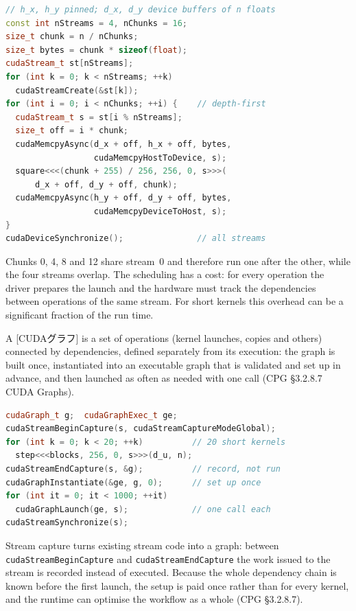 \documentclass[../main.tex]{subfiles}
\begin{document}
\begin{lstlisting}[language=C++, numbers=none]
// h_x, h_y pinned; d_x, d_y device buffers of n floats
const int nStreams = 4, nChunks = 16;
size_t chunk = n / nChunks;
size_t bytes = chunk * sizeof(float);
cudaStream_t st[nStreams];
for (int k = 0; k < nStreams; ++k)
  cudaStreamCreate(&st[k]);
for (int i = 0; i < nChunks; ++i) {    // depth-first
  cudaStream_t s = st[i % nStreams];
  size_t off = i * chunk;
  cudaMemcpyAsync(d_x + off, h_x + off, bytes,
                  cudaMemcpyHostToDevice, s);
  square<<<(chunk + 255) / 256, 256, 0, s>>>(
      d_x + off, d_y + off, chunk);
  cudaMemcpyAsync(h_y + off, d_y + off, bytes,
                  cudaMemcpyDeviceToHost, s);
}
cudaDeviceSynchronize();               // all streams
\end{lstlisting}

Chunks 0, 4, 8 and 12 share stream~0 and therefore run one after the
other, while the four streams overlap.
The scheduling has a cost: for every operation the driver prepares the
launch and the hardware must track the dependencies between operations
of the same stream.  For short kernels this overhead can be a
significant fraction of the run time.

\begin{definition}
  A [CUDAグラフ] is a set of operations (kernel
  launches, copies and others) connected by dependencies, defined
  separately from its execution: the graph is built once, instantiated
  into an executable graph that is validated and set up in advance, and
  then launched as often as needed with one call (CPG §3.2.8.7 CUDA
  Graphs).
\end{definition}

\begin{lstlisting}[language=C++, numbers=none]
cudaGraph_t g;  cudaGraphExec_t ge;
cudaStreamBeginCapture(s, cudaStreamCaptureModeGlobal);
for (int k = 0; k < 20; ++k)          // 20 short kernels
  step<<<blocks, 256, 0, s>>>(d_u, n);
cudaStreamEndCapture(s, &g);          // record, not run
cudaGraphInstantiate(&ge, g, 0);      // set up once
for (int it = 0; it < 1000; ++it)
  cudaGraphLaunch(ge, s);             // one call each
cudaStreamSynchronize(s);
\end{lstlisting}
Stream capture turns existing stream code into a graph: between
\texttt{cudaStream\allowbreak BeginCapture} and
\texttt{cudaStream\allowbreak EndCapture} the
work issued to the stream is recorded instead of executed.  Because the
whole dependency chain is known before the first launch, the setup is
paid once rather than for every kernel, and the runtime can optimise the
workflow as a whole (CPG §3.2.8.7).
\end{document}
